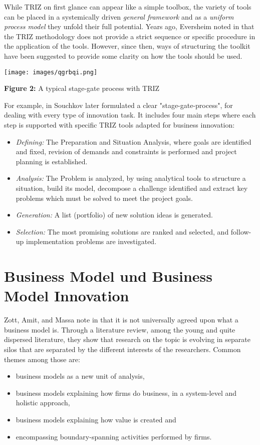 \documentclass[11pt,a4paper]{article}
\begin{document}
While TRIZ on first glance can appear like a simple toolbox, the variety of
tools can be placed in a systemically driven \emph{general framework} and as a
\emph{uniform process model} they unfold their full potential. Years ago,
Eversheim noted in \cite{9} that the TRIZ methodology does not provide a
strict sequence or specific procedure in the application of the tools.
However, since then, ways of structuring the toolkit have been suggested to
provide some clarity on how the tools should be used.

\begin{center}
  \texttt{[image: images/qgrbqi.png]}
  
  \textbf{Figure 2:} A typical stage-gate process with TRIZ \cite{10}
\end{center}

For example, in \cite{10} Souchkov later formulated a clear
"stage-gate-process", for dealing with every type of innovation task. It
includes four main steps where each step is supported with specific TRIZ tools
adapted for business innovation:
\begin{itemize}
\item \emph{Defining:} The Preparation and Situation Analysis, where goals are
  identified and fixed, revision of demands and constraints is performed and
  project planning is established.
\item \emph{Analysis:} The Problem is analyzed, by using analytical tools to
  structure a situation, build its model, decompose a challenge identified and
  extract key problems which must be solved to meet the project goals.
\item \emph{Generation:} A list (portfolio) of new solution ideas is
  generated.
\item \emph{Selection:} The most promising solutions are ranked and selected,
  and follow-up implementation problems are investigated.
\end{itemize}

\section{Business Model und Business Model Innovation}

Zott, Amit, and Massa note in \cite{11} that it is not universally agreed upon
what a business model is. Through a literature review, among the young and
quite dispersed literature, they show that research on the topic is evolving
in separate silos that are separated by the different interests of the
researchers. Common themes among those are:
\begin{itemize}
\item business models as a new unit of analysis,
\item business models explaining how firms do business, in a system-level and
  holistic approach,
\item business models explaining how value is created and
\item encompassing boundary-spanning activities performed by firms.
\end{itemize}
\end{document}
